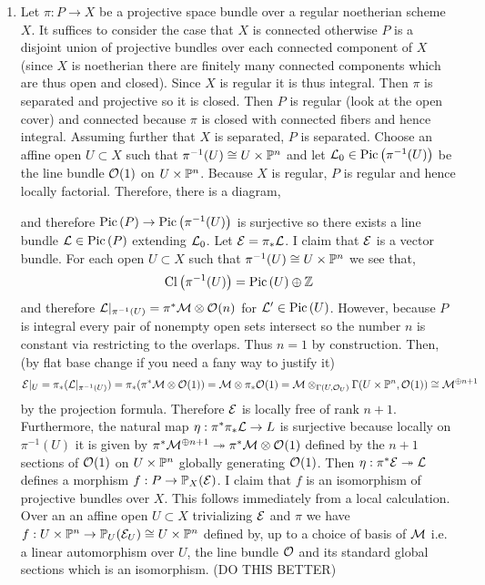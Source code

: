 \documentclass[12pt]{article}
\begin{document}
\begin{enumerate}
\item Let $\pi : P \to X$ be a projective space bundle over a regular noetherian scheme $X$. It suffices to consider the case that $X$ is connected otherwise $P$ is a disjoint union of projective bundles over each connected component of $X$ (since $X$ is noetherian there are finitely many connected components which are thus open and closed). Since $X$ is regular it is thus integral. Then $\pi$ is separated and projective so it is closed. Then $P$ is regular (look at the open cover) and connected because $\pi$ is closed with connected fibers and hence integral. Assuming further that $X$ is separated, $P$ is separated. Choose an affine open $U \subset X$ such that $\pi^{-1}(U) \cong U \times \P^n$ and let $\L_0 \in \Pic{\pi^{-1}(U)}$ be the line bundle $\struct{}(1)$ on $U \times \P^n$. Because $X$ is regular, $P$ is regular and hence locally factorial. Therefore, there is a diagram,
\begin{center}
\end{center}
and therefore $\Pic{P} \to \Pic{\pi^{-1}(U)}$ is surjective so there exists a line bundle $\L \in \Pic{P}$ extending $\L_0$. Let $\E = \pi_* \L$. I claim that $\E$ is a vector bundle. For each open $U \subset X$ such that $\pi^{-1}(U) \cong U \times \P^n$ we see that,
\[ \Cl{\pi^{-1}(U)} = \Pic{U} \oplus \Z \]
and therefore $\L |_{\pi^{-1}(U)} = \pi^* \M \otimes \struct{}(n)$ for $\L' \in \Pic{U}$. However, because $P$ is integral every pair of nonempty open sets intersect so  the number $n$ is constant via restricting to the overlaps. Thus $n = 1$ by construction. Then, (by flat base change if you need a fany way to justify it) 
\[ \E|_U = \pi_* (\L|_{\pi^{-1}(U)}) = \pi_* (\pi^* \M \otimes \struct{}(1)) = \M \otimes \pi_* \struct{}(1) = \M \otimes_{\Gamma(U, \struct{U})} \Gamma(U \times \P^n, \struct{}(1)) \cong \M^{\oplus {n+1}} \] 
by the projection formula. Therefore $\E$ is locally free of rank $n + 1$. Furthermore, the natural map $\eta : \pi^* \pi_* \L \to L$ is surjective because locally on $\pi^{-1}(U)$ it is given by $\pi^* \M^{\oplus n + 1} \onto \pi^* \M \otimes \struct{}(1)$ defined by the $n+1$ sections of $\struct{}(1)$ on $U \times \P^n$ globally generating $\struct{}(1)$. Then $\eta : \pi^* \E \onto \L$ defines a morphism $f : P \to \P_X(\E)$. I claim that $f$ is an isomorphism of projective bundles over $X$. This follows immediately from a local calculation. Over an an affine open $U \subset X$ trivializing $\E$ and $\pi$ we have $f : U \times \P^n \to \P_U(\E_U) \cong U \times \P^n$ defined by, up to a choice of basis of $\M$ i.e. a linear automorphism over $U$, the line bundle $\struct{}$ and its standard global sections which is an isomorphism. (DO THIS BETTER)




\end{enumerate}
\end{document}
